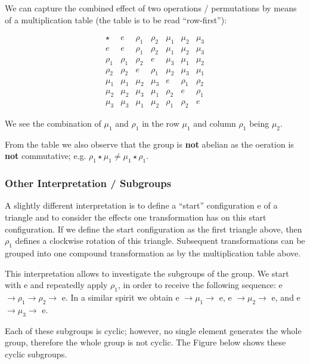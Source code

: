 We can capture the combined effect of two operations / permutations by
means of a multiplication table (the table is to be read ``row-first''):

\[
\begin{array}{c|cccccc}
\star  & e     & \rho_1 & \rho_2 & \mu_1 & \mu_2 & \mu_3 \\
\hline
e     & e     & \rho_1 & \rho_2 & \mu_1 & \mu_2 & \mu_3 \\
\rho_1 & \rho_1 & \rho_2 & e     & \mu_3 & \mu_1 & \mu_2 \\
\rho_2 & \rho_2 & e     & \rho_1 & \mu_2 & \mu_3 & \mu_1 \\
\mu_1  & \mu_1  & \mu_2  & \mu_3  & e    & \rho_1& \rho_2\\
\mu_2  & \mu_2  & \mu_3  & \mu_1  & \rho_2 & e    & \rho_1\\
\mu_3  & \mu_3  & \mu_1  & \mu_2  & \rho_1 & \rho_2& e
\end{array}
\]

We see the combination of \(\mu_1\) and \(\rho_1\) in the row \(\mu_1\)
and column \(\rho_1\) being \(\mu_2\).

From the table we also observe that the group is \textbf{not} abelian as
the oeration is \textbf{not} commutative; e.g.
\(\rho_1 \star \mu_1 \neq \mu_1 \star \rho_1\).

\subsubsection{Other Interpretation /
Subgroups}\label{other-interpretation-subgroups}

A slightly different interpretation is to define a ``start''
configuration e of a triangle and to consider the effects one
transformation has on this start configuration. If we define the start
configuration as the first triangle above, then \(\rho_1\) defines a
clockwise rotation of this triangle. Subsequent transformations can be
grouped into one compound transformation as by the multiplication table
above.

This interpretation allows to investigate the subgroups of the group. We
start with e and repeatedly apply \(\rho_1\), in order to receive the
following sequence: e
\(\rightarrow \rho_1 \rightarrow \rho_2 \rightarrow\) e. In a similar
spirit we obtain e \(\rightarrow \mu_1 \rightarrow\) e, e
\(\rightarrow \mu_2 \rightarrow\) e, and e
\(\rightarrow \mu_3 \rightarrow\) e.

Each of these subgroups is cyclic; however, no single element generates
the whole group, therefore the whole group is not cyclic. The Figure
below shows these cyclic subgroups.

